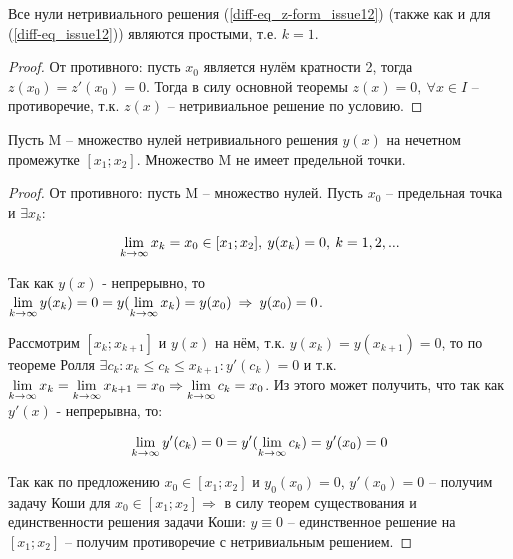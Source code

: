 \begin{lemma}\label{sol-zeros_issue12}
Все нули нетривиального решения (\ref{diff-eq_z-form_issue12}) (также как и для (\ref{diff-eq_issue12})) являются простыми, т.е. $k = 1$.
\end{lemma}

\begin{proof}
От противного: пусть $x_0$ является нулём кратности 2, тогда $z(x_0) = z'(x_0) = 0$. Тогда в силу основной теоремы $z(x) = 0, \: \forall x \in I$ -- противоречие, т.к. $z(x)$ -- нетривиальное решение по условию.
\end{proof}

\begin{lemma}\label{sol-set_issue12}
Пусть M -- множество нулей нетривиального решения $y(x)$ на нечетном промежутке $[x_1;x_2]$. Множество M не имеет предельной точки.
\end{lemma}

\begin{proof}
От противного: пусть M -- множество нулей. Пусть $x_0$ -- предельная точка и $\exists {x_k} :$ 

\[\lim\limits_{k\rightarrow \infty} x_k = x_0 \in [x_1;x_2], \: y(x_k) = 0, \: k = 1,2,...\]

Так как $y(x)$ - непрерывно, то $\lim\limits_{k\rightarrow \infty} y(x_k) = 0 = y (\lim\limits_{k\rightarrow \infty} x_k) = y(x_0) \: \Rightarrow \: y(x_0) = 0$.

Рассмотрим $[x_k;x_{k+1}]$ и $y(x)$ на нём, т.к. $y(x_k) = y(x_{k+1}) = 0$, то по теореме Ролля $\exists c_k: x_k \leq c_k \leq x_{k+1}: y'(c_k) = 0$ и т.к. $\lim\limits_{k\rightarrow \infty} x_k = \lim\limits_{k\rightarrow \infty} x_{k+1} = x_0 \Rightarrow \lim\limits_{k\rightarrow \infty} c_k = x_0$. Из этого может получить, что так как $y'(x)$ - непрерывна, то:

\[\lim\limits_{k\rightarrow \infty} y' (c_k) = 0 = y' (\lim\limits_{k\rightarrow \infty} c_k) = y'(x_0) = 0\]

Так как по предложению $x_0 \in [x_1;x_2]$ и $y_0(x_0) = 0$, $y'(x_0) = 0$ -- получим задачу Коши для $x_0 \in [x_1;x_2] \Rightarrow$ в силу теорем существования и единственности решения задачи Коши: $y\equiv 0$ -- единственное решение на $[x_1;x_2]$ -- получим противоречие с нетривиальным решением.
\end{proof}

